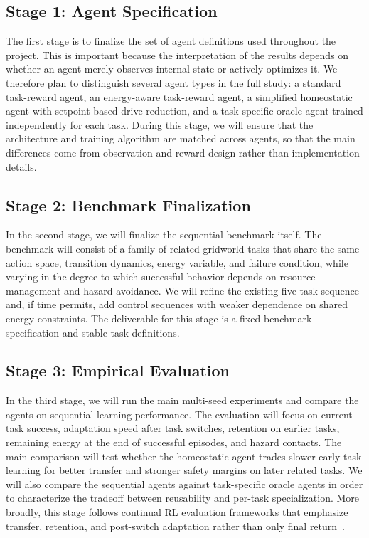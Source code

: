 \documentclass[sigplan,10pt]{acmart}
\begin{document}
\subsection{Stage 1: Agent Specification}
The first stage is to finalize the set of agent definitions used throughout the project. This is important because the interpretation of the results depends on whether an agent merely observes internal state or actively optimizes it. We therefore plan to distinguish several agent types in the full study: a standard task-reward agent, an energy-aware task-reward agent, a simplified homeostatic agent with setpoint-based drive reduction, and a task-specific oracle agent trained independently for each task. During this stage, we will ensure that the architecture and training algorithm are matched across agents, so that the main differences come from observation and reward design rather than implementation details.

\subsection{Stage 2: Benchmark Finalization}
In the second stage, we will finalize the sequential benchmark itself. The benchmark will consist of a family of related gridworld tasks that share the same action space, transition dynamics, energy variable, and failure condition, while varying in the degree to which successful behavior depends on resource management and hazard avoidance. We will refine the existing five-task sequence and, if time permits, add control sequences with weaker dependence on shared energy constraints. The deliverable for this stage is a fixed benchmark specification and stable task definitions.

\subsection{Stage 3: Empirical Evaluation}
In the third stage, we will run the main multi-seed experiments and
compare the agents on sequential learning performance. The evaluation
will focus on current-task success, adaptation speed after task
switches, retention on earlier tasks, remaining energy at the end of
successful episodes, and hazard contacts. The main comparison will test
whether the homeostatic agent trades slower early-task learning for
better transfer and stronger safety margins on later related tasks. We
will also compare the sequential agents against task-specific oracle
agents in order to characterize the tradeoff between reusability and
per-task specialization. More broadly, this stage follows continual RL
evaluation frameworks that emphasize transfer, retention, and
post-switch adaptation rather than only final return~\cite{continualworld2021,cora2022}.
\end{document}
